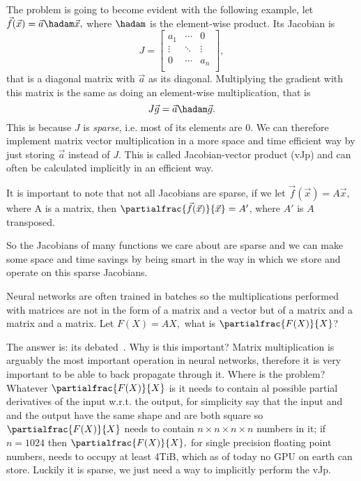 \documentclass{article}
\begin{document}
The problem is going to become evident with the following example, let
\(\vec f(\vec x) = \vec a \hadam \vec x,\) where \(\hadam\) is the element-wise
product. Its Jacobian is \[
J = \left[\begin{array}{ccc}
a_1 & \cdots & 0 \\
\vdots & \ddots & \vdots \\
0 & \cdots & a_n \\
\end{array}\right]\!,
\] that is a diagonal matrix with \(\vec a\) as its diagonal. Multiplying the
gradient with this matrix is the same as doing an element-wise multiplication,
that is \[
J \vec g = \vec a \hadam \vec g.
\] This is because \(J\) is \emph{sparse}, i.e. most of its elements are 0.
We can therefore implement matrix vector multiplication in a more space and
time efficient way by just storing \(\vec a\) instead of \(J\). This is called
Jacobian-vector product (vJp) and can often be calculated implicitly in an
efficient way.

It is important to note that not all Jacobians are sparse, if we let \(\vec
f(\vec x) = A \vec x,\) where A is a matrix, then
\(\partialfrac{\vec f(\vec x)}{\vec x} = A'\), where \(A'\) is \(A\)
transposed.

So the Jacobians of many functions we care about are sparse and we can make some
space and time savings by being smart in the way in which we store and operate
on this sparse Jacobians.

Neural networks are often trained in batches so the multiplications performed
with matrices are not in the form of a matrix and a vector but of a matrix and
a matrix and a matrix. Let \(F(X) = AX,\) what is \(\partialfrac{F(X)}{X}\)?

The answer is: its debated~\cite{notion}. Why is this important? Matrix
multiplication is arguably the most important operation in neural networks,
therefore it is very important to be able to back propagate through it. Where
is the problem? Whatever \(\partialfrac{F(X)}{X}\) is it needs to contain al
possible partial derivatives of the input w.r.t. the output, for simplicity say
that the input and and the output have the same shape and are both square so
\(\partialfrac{F(X)}{X}\) needs to contain \(n \times n \times n \times n\)
numbers in it; if \(n=1024\) then \(\partialfrac{F(X)}{X},\) for single
precision floating point numbers, needs to occupy at least 4TiB, which as of
today no GPU on earth can store. Luckily it is sparse, we just need a way to
implicitly perform the vJp.
\end{document}
